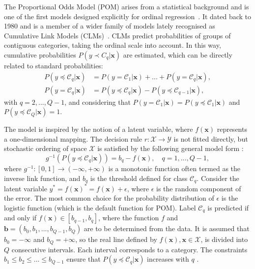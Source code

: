 \documentclass[preprint]{elsarticle}
\begin{document}
The Proportional Odds Model (POM) arises from a statistical background and is one of the first models designed explicitly for ordinal regression~\cite{mccullagh1980regression}. It dated back to 1980 and is a member of a wider family of models lately recognised as Cumulative Link Models (CLMs)~\cite{agresti2010analysis}. CLMs predict probabilities of groups of contiguous categories, taking the ordinal scale into account. In this way, cumulative probabilities $P(y \prec C_q |\mathbf{x})$ are estimated, which can be directly related to standard probabilities:
\begin{align}
\nonumber P(y \preceq \mathcal{C}_q | \mathbf{x}) &= P(y = \mathcal{C}_1 | \mathbf{x}) + ... + P(y = \mathcal{C}_q | \mathbf{x}),\\
\nonumber P(y = \mathcal{C}_q | \mathbf{x}) &= P(y \preceq \mathcal{C}_q | \mathbf{x}) - P(y \preceq \mathcal{C}_{q-1} | \mathbf{x}),
\end{align}
with $q = 2, ..., Q-1$, and considering that $P(y = \mathcal{C}_1 | \mathbf{x}) = P(y \preceq \mathcal{C}_1 | \mathbf{x})$ and $P(y \preceq \mathcal{C}_Q | \mathbf{x}) = 1$.

The model is inspired by the notion of a latent variable, where $f(\textbf{x})$ represents a one-dimensional mapping. The decision rule $r: \mathcal{X} \rightarrow \mathcal{Y}$ is not fitted directly, but stochastic ordering of space $\mathcal{X}$ is satisfied by the following general model form \cite{herbrich2000large}:
\begin{equation}
\nonumber
g^{-1}(P(y \preceq \mathcal{C}_q | \mathbf{x})) = b_q - f(\mathbf{x}), \quad q = 1, ..., Q-1,
\end{equation}
where $g^{-1} : [0,1] \rightarrow (-\infty, +\infty)$ is a monotonic function often termed as the inverse link function, and $b_q$ is the threshold defined for class $\mathcal{C}_q$. Consider the latent variable $y^* = f(\mathbf{x})^* = f(\mathbf{x}) + \epsilon$, where $\epsilon$ is the random component of the error. The most common choice for the probability distribution of $\epsilon$ is the logistic function (which is the default function for POM). Label $\mathcal{C}_q$ is predicted if and only if $f(\mathbf{x}) \in [b_{q-1}, b_q]$, where the function $f$ and $\mathbf{b} = (b_0, b_1, ..., b_{Q-1}, b_Q)$ are to be determined from the data. It is assumed that $b_0 = -\infty$ and $b_Q = +\infty$, so the real line defined by $f(\textbf{x}), \textbf{x} \in \mathcal{X}$, is divided into $Q$ consecutive intervals. Each interval corresponds to a category. The constraints $b_1 \le b_2 \le ... \le b_{Q-1}$ ensure that $P(y \preceq \mathcal{C}_q | \mathbf{x})$ increases with $q$ \cite{mccullagh1980regression}.
\end{document}
